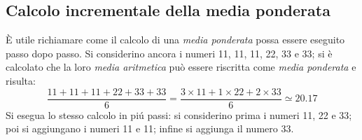 \documentclass[12pt,a4paper]{article}
\begin{document}
\subsection{Calcolo incrementale della media ponderata}


È utile richiamare  come il calcolo di  una \emph{media ponderata} possa essere  eseguito passo dopo
passo.  Si considerino ancora i numeri  \num{11}, \num{11}, \num{11}, \num{22}, \num{33} e \num{33};
si è calcolato che la loro \emph{media  aritmetica} può essere riscritta come \emph{media ponderata}
e risulta:
\begin{equation*}
  \frac{\num{11} + \num{11} + \num{11} + \num{22} + \num{33} + \num{33}}{6}
  = \frac{\num{3} \times{} \num{11}
     + \num{1} \times{} \num{22}
     + \num{2} \times{} \num{33}}
  {6} \simeq \num{20,17}
\end{equation*}
Si  esegua lo  stesso calcolo  in piú  passi: si  considerino prima  i numeri  \num{11}, \num{22}  e
\num{33}; poi si aggiungano i numeri \num{11} e \num{11}; infine si aggiunga il numero \num{33}.
\end{document}
